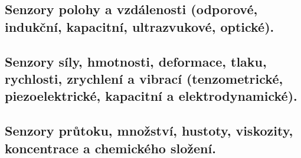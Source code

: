 \subsection{Senzory polohy a vzdálenosti (odporové, indukční, kapacitní, ultrazvukové, optické).}

\subsection{Senzory síly, hmotnosti, deformace, tlaku, rychlosti, zrychlení a vibrací (tenzometrické, piezoelektrické, kapacitní a elektrodynamické).}

\subsection{Senzory průtoku, množství, hustoty, viskozity, koncentrace a chemického složení.}
